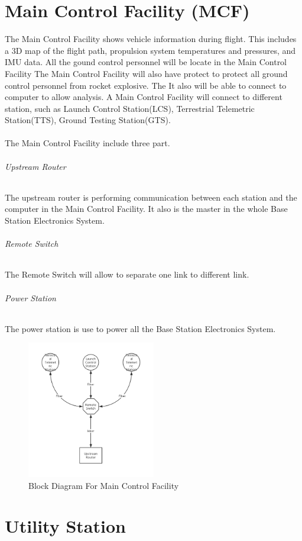 \documentclass[12pt,article]{memoir}
\begin{document}
\chapter{Main Control Facility (MCF)}
The Main Control Facility shows vehicle information during flight. This includes a 3D map of the flight path, propulsion system temperatures and pressures, and IMU data. All the gound control personnel will be locate in the Main Control Facility The Main Control Facility will also have protect to protect all ground control personnel from rocket explosive. The  It also will be able to connect to computer to allow analysis. A Main Control Facility will connect to different station, such as Launch Control Station(LCS), Terrestrial Telemetric Station(TTS), Ground Testing Station(GTS).\\\\
The Main Control Facility include three part.
\subparagraph{Upstream Router}
The upstream router is performing communication between each station and the computer in the Main Control Facility. It also is the master in the whole Base Station Electronics System.
\subparagraph{Remote Switch}
The Remote Switch will allow to separate one link to different link.
\subparagraph{Power Station} The power station is use to power all the Base Station Electronics System.
\\
\begin{figure}[htp]
\begin{center}
\includegraphics[width=0.5\textwidth]{img/ES00004_MCF.png}
 \caption{Block Diagram For Main Control Facility}	
\end{center}
\end{figure}
\newpage
\chapter{Utility Station}
\end{document}
